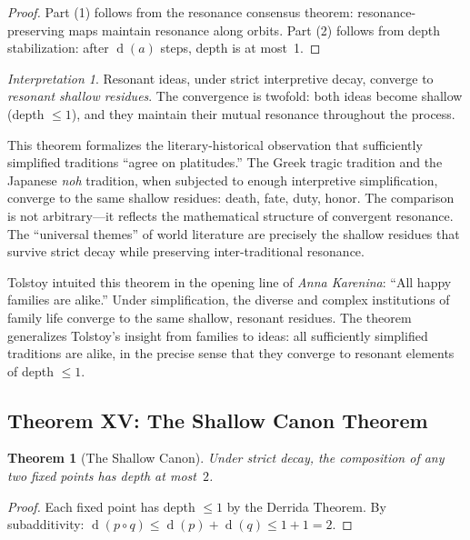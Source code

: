 \documentclass[11pt,openany]{book}
\theoremstyle{definition}
\theoremstyle{plain}
\newtheorem{theorem}[axiom]{Theorem}
\theoremstyle{remark}
\newtheorem{interpretation}[axiom]{Interpretation}
\newcommand{\compose}{\circ}                 %
\newcommand{\depth}{\operatorname{d}}       %
\begin{document}
\begin{proof}
Part (1) follows from the resonance consensus theorem: resonance-preserving maps maintain resonance along orbits. Part (2) follows from depth stabilization: after $\depth(a)$ steps, depth is at most~1.
\end{proof}

\begin{interpretation}
Resonant ideas, under strict interpretive decay, converge to \emph{resonant shallow residues}. The convergence is twofold: both ideas become shallow (depth $\leq 1$), and they maintain their mutual resonance throughout the process.

This theorem formalizes the literary-historical observation that sufficiently simplified traditions ``agree on platitudes.'' The Greek tragic tradition and the Japanese \textit{noh} tradition, when subjected to enough interpretive simplification, converge to the same shallow residues: death, fate, duty, honor. The comparison is not arbitrary---it reflects the mathematical structure of convergent resonance. The ``universal themes'' of world literature are precisely the shallow residues that survive strict decay while preserving inter-traditional resonance.

Tolstoy intuited this theorem in the opening line of \textit{Anna Karenina}: ``All happy families are alike.'' Under simplification, the diverse and complex institutions of family life converge to the same shallow, resonant residues. The theorem generalizes Tolstoy's insight from families to ideas: all sufficiently simplified traditions are alike, in the precise sense that they converge to resonant elements of depth $\leq 1$.
\end{interpretation}

\subsection{Theorem XV: The Shallow Canon Theorem}

\begin{theorem}[The Shallow Canon]
\label{thm:key-shallow-canon}
Under strict decay, the composition of any two fixed points has depth at most~$2$.
\end{theorem}

\begin{proof}
Each fixed point has depth $\leq 1$ by the Derrida Theorem. By subadditivity: $\depth(p \compose q) \leq \depth(p) + \depth(q) \leq 1 + 1 = 2$.
\end{proof}
\end{document}
